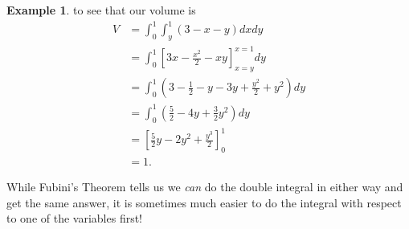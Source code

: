 \documentclass[12pt, letter]{article}
\theoremstyle{plain}
\numberwithin{theorem}{section}
\theoremstyle{definition}
\newtheorem{example}[theorem]{Example}
\begin{document}
\begin{example}
\bigskip

to see that our volume is
\begin{align*}
V&=\int_0^1 \int_y^1 (3-x-y)dxdy\\
&=\int_0^1 \left[3x-\frac{x^2}{2}-xy\right]_{x=y}^{x=1}dy\\
&= \int_0^1 \left(3-\frac{1}{2}-y-3y+\frac{y^2}{2}+y^2\right)dy\\
&= \int_0^1 \left(\frac{5}{2}-4y+\frac{3}{2}y^2\right)dy\\
&= \left[\frac{5}{2}y-2y^2+\frac{y^3}{2}\right]_0^1\\
&=1.
\end{align*}

\end{example}

\bigskip

\hrulefill

\bigskip

While Fubini's Theorem tells us we \textit{can} do the double integral in either way and get the same answer, it is sometimes much easier to do the integral with respect to one of the variables first!

\bigskip

\hrulefill

\bigskip
\end{document}

